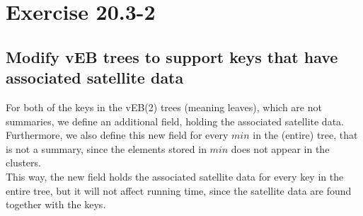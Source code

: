 \section*{Exercise 20.3-2}
\subsection*{Modify vEB trees to support keys that have associated satellite data}

For both of the keys in the vEB(2) trees (meaning leaves), which are not summaries, we define an additional field, holding the associated satellite data.
\\
Furthermore, we also define this new field for every $min$ in the (entire) tree, that is not a summary, since the elements stored in $min$ does not appear in the clusters.
\\
This way, the new field holds the associated satellite data for every key in the entire tree, but it will not affect running time, since the satellite data are found together with the keys.